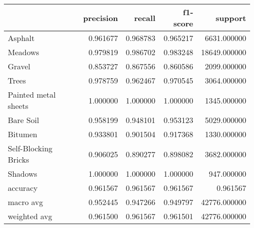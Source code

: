 \begin{tabular}{lrrrr}
\toprule
{} &  precision &    recall &  f1-score &       support \\
\midrule
Asphalt              &   0.961677 &  0.968783 &  0.965217 &   6631.000000 \\
Meadows              &   0.979819 &  0.986702 &  0.983248 &  18649.000000 \\
Gravel               &   0.853727 &  0.867556 &  0.860586 &   2099.000000 \\
Trees                &   0.978759 &  0.962467 &  0.970545 &   3064.000000 \\
Painted metal sheets &   1.000000 &  1.000000 &  1.000000 &   1345.000000 \\
Bare Soil            &   0.958199 &  0.948101 &  0.953123 &   5029.000000 \\
Bitumen              &   0.933801 &  0.901504 &  0.917368 &   1330.000000 \\
Self-Blocking Bricks &   0.906025 &  0.890277 &  0.898082 &   3682.000000 \\
Shadows              &   1.000000 &  1.000000 &  1.000000 &    947.000000 \\
accuracy             &   0.961567 &  0.961567 &  0.961567 &      0.961567 \\
macro avg            &   0.952445 &  0.947266 &  0.949797 &  42776.000000 \\
weighted avg         &   0.961500 &  0.961567 &  0.961501 &  42776.000000 \\
\bottomrule
\end{tabular}
